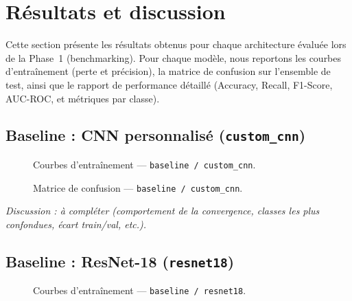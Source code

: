 \section{Résultats et discussion}
\label{sec:resultats}

Cette section présente les résultats obtenus pour chaque architecture évaluée
lors de la Phase~1 (benchmarking). Pour chaque modèle, nous reportons les
courbes d'entraînement (perte et précision), la matrice de confusion sur
l'ensemble de test, ainsi que le rapport de performance détaillé
(Accuracy, Recall, F1-Score, AUC-ROC, et métriques par classe).

\subsection{Baseline : CNN personnalisé (\texttt{custom\_cnn})}
\label{subsec:baseline_custom_cnn}

\begin{figure}[H]
    \centering
    \caption{Courbes d'entraînement --- \texttt{baseline / custom\_cnn}.}
    \label{fig:hist_baseline_custom_cnn}
\end{figure}

\begin{figure}[H]
    \centering
    \caption{Matrice de confusion --- \texttt{baseline / custom\_cnn}.}
    \label{fig:cm_baseline_custom_cnn}
\end{figure}


\textit{Discussion : à compléter (comportement de la convergence, classes
les plus confondues, écart train/val, etc.).}

\subsection{Baseline : ResNet-18 (\texttt{resnet18})}
\label{subsec:baseline_resnet18}

\begin{figure}[H]
    \centering
    \caption{Courbes d'entraînement --- \texttt{baseline / resnet18}.}
    \label{fig:hist_baseline_resnet18}
\end{figure}

